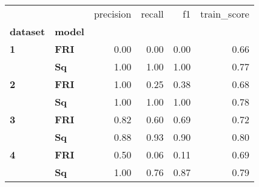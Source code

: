\begin{tabular}{llrrrr}
\toprule
  &    &  precision &  recall &    f1 &  train\_score \\
\textbf{dataset} & \textbf{model} &            &         &       &              \\
\midrule
\textbf{1} & \textbf{FRI} &       0.00 &    0.00 &  0.00 &         0.66 \\
  & \textbf{Sq} &       1.00 &    1.00 &  1.00 &         0.77 \\
\textbf{2} & \textbf{FRI} &       1.00 &    0.25 &  0.38 &         0.68 \\
  & \textbf{Sq} &       1.00 &    1.00 &  1.00 &         0.78 \\
\textbf{3} & \textbf{FRI} &       0.82 &    0.60 &  0.69 &         0.72 \\
  & \textbf{Sq} &       0.88 &    0.93 &  0.90 &         0.80 \\
\textbf{4} & \textbf{FRI} &       0.50 &    0.06 &  0.11 &         0.69 \\
  & \textbf{Sq} &       1.00 &    0.76 &  0.87 &         0.79 \\
\bottomrule
\end{tabular}

